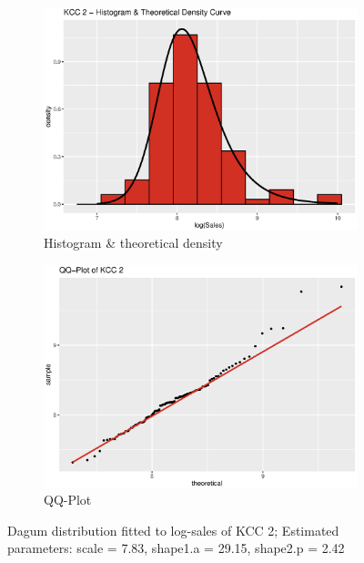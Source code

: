  \begin{figure}[H]
\centering
\begin{subfigure}{.45\textwidth}
  \centering
  \includegraphics[width=\linewidth]{figures/kcc_2_density.eps}
  \caption{Histogram \& theoretical density}
  \label{fig:kcc_2_density}
\end{subfigure}
\begin{subfigure}{.45\textwidth}
  \centering
  \includegraphics[width=\linewidth]{figures/kcc_2_qqplot.eps}
  \caption{QQ-Plot}
  \label{fig:kcc_2_qqplot}
\end{subfigure}
\caption{Dagum distribution fitted to log-sales of \ac{KCC} 2; Estimated parameters: scale = 7.83, shape1.a = 29.15, shape2.p = 2.42}
\label{fig:kcc_2_marginal}
\end{figure} 





